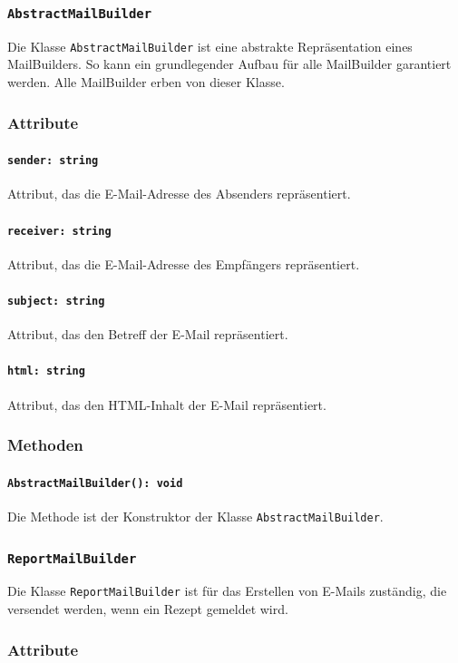 \documentclass{entwurfsheft}
\begin{document}
\subsubsection{\texttt{AbstractMailBuilder}}\label{sec:AbstractMailBuilder}
Die Klasse \texttt{AbstractMailBuilder} ist eine abstrakte Repräsentation eines MailBuilders. So kann ein grundlegender Aufbau für alle MailBuilder garantiert werden. Alle MailBuilder erben von dieser Klasse.
\subsubsection*{Attribute}
\paragraph{\texttt{sender: string}}
Attribut, das die E-Mail-Adresse des Absenders repräsentiert.
\paragraph{\texttt{receiver: string}}
Attribut, das die E-Mail-Adresse des Empfängers repräsentiert.
\paragraph{\texttt{subject: string}}
Attribut, das den Betreff der E-Mail repräsentiert.
\paragraph{\texttt{html: string}}
Attribut, das den HTML-Inhalt der E-Mail repräsentiert.

\subsubsection*{Methoden}
\paragraph{\texttt{AbstractMailBuilder(): void}}
Die Methode ist der Konstruktor der Klasse \texttt{AbstractMailBuilder}.

\subsubsection{\texttt{ReportMailBuilder}}\label{sec:ReportMailBuilder}
Die Klasse \texttt{ReportMailBuilder} ist für das Erstellen von E-Mails zuständig, die versendet werden, wenn ein Rezept gemeldet wird.
\subsubsection*{Attribute}
\end{document}
